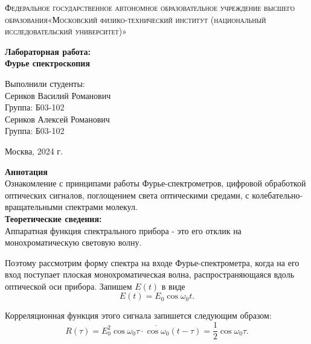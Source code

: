 \documentclass[a4paper, 12pt]{article}%
\begin{document}
	\begin{titlepage}
		\begin{center}
			\textsc{Федеральное государственное автономное образовательное учреждение высшего образования«Московский физико-технический институт (национальный исследовательский университет)»\\[5mm]
			}
			
			\vfill
			
			\textbf{Лабораторная работа: \\[3mm]
				Фурье спектроскопия
				\\[50mm]
			}
			
		\end{center}
		
		\hfill
		\begin{minipage}{.5\textwidth}
			Выполнили студенты:\\[2mm]
			Сериков Василий Романович\\[2mm]
			Группа: Б03-102\\[5mm]
			Сериков Алексей Романович\\[2mm]
			Группа: Б03-102\\[5mm]
			
		\end{minipage}
		\vfill
		\begin{center}
			Москва, 2024 г.
		\end{center}
		
	\end{titlepage}
	
	\newpage
	\textbf{Аннотация}\\
	
	Ознакомление с принципами работы Фурье-спектрометров, цифровой обработкой оптических сигналов, поглощением света оптическими средами, с колебательно-вращательными спектрами молекул. \\
	
	\textbf{Теоретические сведения: }\\
	
	
	Аппаратная функция спектрального прибора - это его отклик на монохроматическую световую волну.
	
	Поэтому рассмотрим форму спектра на входе Фурье-спектрометра, когда на его вход поступает плоская монохроматическая волна, распространяющаяся вдоль оптической оси прибора. Запишем $E(t)$ в виде
	$$
	E(t)=E_0 \cos \omega_0 t .
	$$
	
	Корреляционная функция этого сигнала запишется следующим образом:
	$$
	R(\tau)=E_0^2 \overline{\cos \omega_0 \tau \cdot \cos \omega_0(t-\tau)}=\frac{1}{2} \cos \omega_0 \tau .
	$$
	
\end{document}
